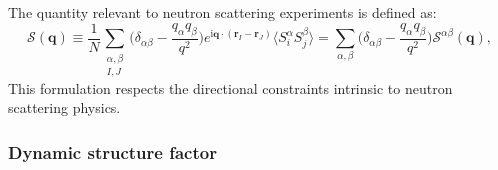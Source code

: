 \documentclass[aps, prx, nofootinbib, superscriptaddress]{revtex4-2}
\newcommand{\ri}{\mathrm{i}}
\begin{document}
The quantity relevant to neutron scattering experiments is defined as:
\begin{equation}
    \mathcal{S} (\mathbf{q}) 
    \equiv 
    \frac{1}{N} 
    \sum_{\substack{\alpha, \beta \\ I, J}}
    \Big(
    \delta_{\alpha\beta} - \frac{q_{\alpha} q_{\beta}}{q^{2}} 
    \Big)
    e^{\ri \mathbf{q} \cdot ( \mathbf{r}_{I} - \mathbf{r}_{J} ) }
    \langle 
    S_{i}^{\alpha}
    S_{j}^{\beta} 
    \rangle
    = 
    \sum_{\alpha, \beta} 
    \Big( \delta_{\alpha\beta} - \frac{q_{\alpha} q_{\beta}}{q^{2}} \Big)
    \mathcal{S}^{\alpha\beta} (\mathbf{q}) ,
\end{equation}
This formulation respects the directional constraints intrinsic to neutron scattering physics.



\subsubsection{Dynamic structure factor} 
\end{document}
